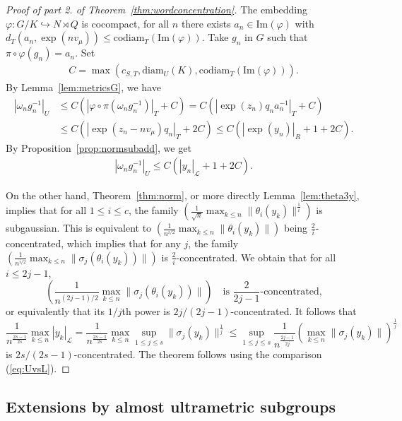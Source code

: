 \documentclass[11pt,leqno]{article}
\theoremstyle{plain}
\theoremstyle{definition}
\theoremstyle{remark}
\numberwithin{equation}{section}
\begin{document}
\begin{proof}[Proof of part 2. of Theorem~\ref{thm:wordconcentration}]
The embedding $\varphi:G/K  \hookrightarrow N \rtimes Q$ is cocompact, for all $n$ there exists $a_n \in \mathrm{Im}(\varphi)$ with $d_T(a_n,\exp(nv_\mu))\le \mathrm{codiam}_T(\mathrm{Im}(\varphi))$. Take $g_n$ in $G$ such that $\pi \circ \varphi(g_n)=a_n$.  Set 
\begin{align}\label{eq:Ccompact}
C=\max\left(c_{S,T},\mathrm{diam}_U(K),\mathrm{codiam}_T(\mathrm{Im}(\varphi))\right).
\end{align} 
By Lemma~\ref{lem:metricsG}, we have
\begin{align*}
|\omega_ng_n^{-1}|_U & \le C (|\varphi\circ \pi(\omega_ng_n^{-1})|_T+C) =C\left(|\exp(z_n)q_na_n^{-1}|_T+C \right)\\
 & \le C\left(|\exp(z_n-nv_\mu)q_n|_T+2C \right) \le C\left(|\exp(y_n)|_R+1+2C\right).
\end{align*}
By Proposition~\ref{prop:normsubadd}, we get 
\begin{align}\label{eq:UvsL}
|\omega_ng_n^{-1}|_U \le C(|y_n|_{\mathcal{L}}+1+2C).
\end{align}

On the other hand, Theorem~\ref{thm:norm}, or more directly Lemma~\ref{lem:theta3y}, implies that for all $1 \le i \le c$, the family $\left( \frac{1}{\sqrt{n}}\max_{k\le n}\|\theta_i(y_k)\|^{\frac{1}{i}}\right)$ is subgaussian. This is equivalent to  $\left( \frac{1}{n^{i/2}}\max_{k\le n}\|\theta_i(y_k)\|\right)$ being $\frac{2}{i}$-concentrated, which implies that for any $j$, the family $\left( \frac{1}{n^{i/2}}\max_{k\le n}\|\sigma_j(\theta_i(y_k))\|\right)$  is $\frac{2}{i}$-concentrated. We obtain that for all  $i \le 2j-1$,
\[
\left( \frac{1}{n^{(2j-1)/2}}\max_{k\le n}\|\sigma_j(\theta_i(y_k))\|\right) \quad \textrm{is }\frac{2}{2j-1}\textrm{-concentrated,}
\]
or equivalently that its $1/j$th power is $2j/(2j-1)$-concentrated. It follows that
\[
\frac{1}{n^\frac{2s-1}{2s}}\max_{k\le n}|y_k|_{\mathcal{L}} =\frac{1}{n^\frac{2s-1}{2s}}\max_{k\le n}\sup_{1\le j\le s}\|\sigma_j(y_k)\|^{\frac{1}{j}}\le \sup_{1\le j\le s} \frac{1}{n^{\frac{2j-1}{2j}}}\left( \max_{k\le n} \|\sigma_j(y_k)\|\right)^{\frac{1}{j}}
\]
is $2s/(2s-1)$-concentrated. The theorem follows using the comparison (\ref{eq:UvsL}).
\end{proof}


\subsection{Extensions by almost ultrametric subgroups}
\end{document}
